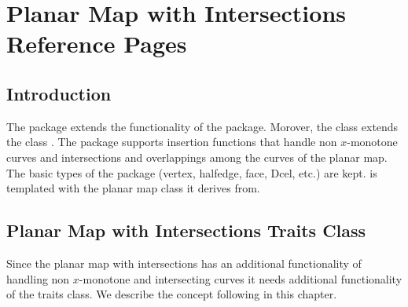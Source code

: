 


\clearpage
\section{Planar Map with Intersections Reference Pages}

\subsection*{Introduction}

  The  package extends the
  functionality of the  package. Morover, the class
   extends the class
  . The  package
  supports insertion functions that handle non $x$-monotone curves and
  intersections and overlappings among the curves of the planar
  map. The basic types of the  package (vertex,
  halfedge, face, Dcel, etc.) are
  kept.  is templated with the
  planar map class it derives from.

\subsection*{Planar Map with Intersections Traits Class}
  Since the planar map with intersections has an additional
  functionality of handling non $x$-monotone and intersecting curves
  it needs additional functionality of the traits class. We describe
  the  concept following in
  this chapter. 


